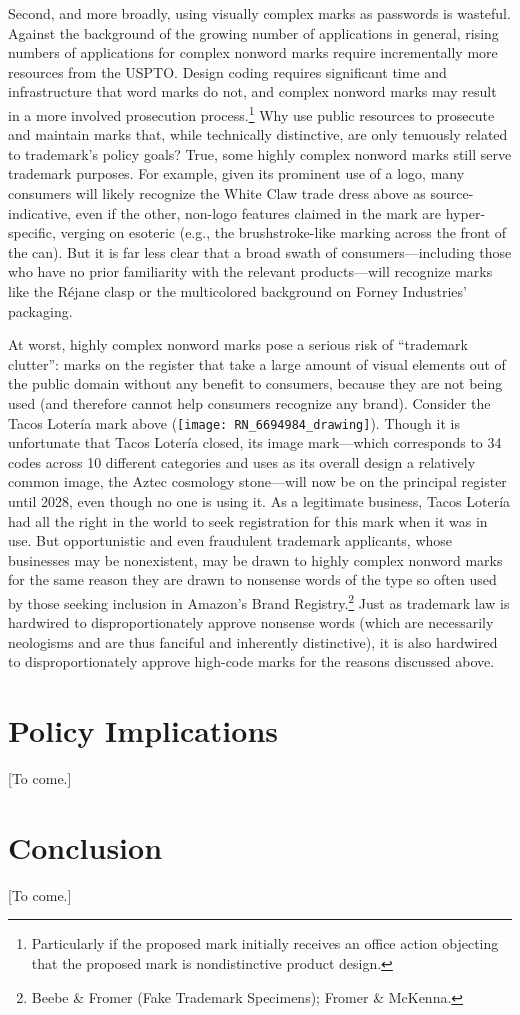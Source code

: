 \documentclass[letterpaper, 11pt, oneside]{article}
\begin{document}
Second, and more broadly, using visually complex marks as passwords is wasteful. Against the background of the growing number of applications in general, rising numbers of applications for complex nonword marks require incrementally more resources from the USPTO. Design coding requires significant time and infrastructure that word marks do not, and complex nonword marks may result in a more involved prosecution process.\footnote{Particularly if the proposed mark initially receives an office action objecting that the proposed mark is nondistinctive product design.} Why use public resources to prosecute and maintain marks that, while technically distinctive, are only tenuously related to trademark's policy goals? True, some highly complex nonword marks still serve trademark purposes. For example, given its prominent use of a logo, many consumers will likely recognize the White Claw trade dress above as source-indicative, even if the other, non-logo features claimed in the mark are hyper-specific, verging on esoteric (e.g., the brushstroke-like marking across the front of the can). But it is far less clear that a broad swath of consumers—including those who have no prior familiarity with the relevant products—will recognize marks like the Réjane clasp or the multicolored background on Forney Industries' packaging.

At worst, highly complex nonword marks pose a serious risk of ``trademark clutter'': marks on the register that take a large amount of visual elements out of the public domain without any benefit to consumers, because they are not being used (and therefore cannot help consumers recognize any brand). Consider the Tacos Lotería mark above (\texttt{[image: RN\_6694984\_drawing]}). Though it is unfortunate that Tacos Lotería closed, its image mark—which corresponds to 34 codes across 10 different categories and uses as its overall design a relatively common image, the Aztec cosmology stone—will now be on the principal register until 2028, even though no one is using it. As a legitimate business, Tacos Lotería had all the right in the world to seek registration for this mark when it was in use. But opportunistic and even fraudulent trademark applicants, whose businesses may be nonexistent, may be drawn to highly complex nonword marks for the same reason they are drawn to nonsense words of the type so often used by those seeking inclusion in Amazon's Brand Registry.\footnote{Beebe \& Fromer (Fake Trademark Specimens); Fromer \& McKenna.} Just as trademark law is hardwired to disproportionately approve nonsense words (which are necessarily neologisms and are thus fanciful and inherently distinctive), it is also hardwired to disproportionately approve high-code marks for the reasons discussed above.

\section{Policy Implications} \label{sec:3}


[To come.]

\section*{Conclusion}

[To come.]

\newpage

\singlespacing

\end{document}
